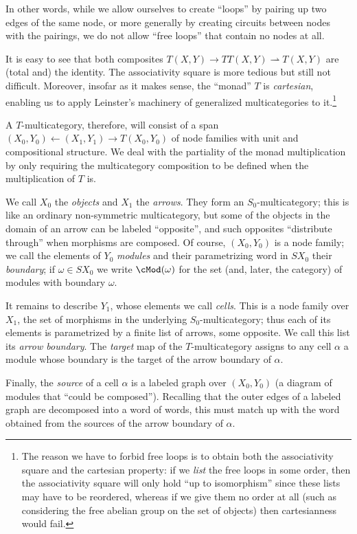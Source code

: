 \documentclass{amsart}
\begin{document}
In other words, while we allow ourselves to create ``loops'' by pairing up two edges of the same node, or more generally by creating circuits between nodes with the pairings, we do not allow ``free loops'' that contain no nodes at all.

It is easy to see that both composites $T(X,Y) \to TT(X,Y) \rightharpoonup T(X,Y)$ are (total and) the identity.
The associativity square is more tedious but still not difficult.
Moreover, insofar as it makes sense, the ``monad'' $T$ is \emph{cartesian}, enabling us to apply Leinster's machinery of generalized multicategories to it.\footnote{The reason we have to forbid free loops is to obtain both the associativity square and the cartesian property: if we \emph{list} the free loops in some order, then the associativity square will only hold ``up to isomorphism'' since these lists may have to be reordered, whereas if we give them no order at all (such as considering the free abelian group on the set of objects) then cartesianness would fail.}

A $T$-multicategory, therefore, will consist of a span $(X_0,Y_0) \leftarrow (X_1,Y_1) \to T(X_0,Y_0)$ of node families with unit and compositional structure.
We deal with the partiality of the monad multiplication by only requiring the multicategory composition to be defined when the multiplication of $T$ is.

We call $X_0$ the \emph{objects} and $X_1$ the \emph{arrows}.
They form an $S_0$-multicategory; this is like an ordinary non-symmetric multicategory, but some of the objects in the domain of an arrow can be labeled ``opposite'', and such opposites ``distribute through'' when morphisms are composed.
Of course, $(X_0,Y_0)$ is a node family; we call the elements of $Y_0$ \emph{modules} and their parametrizing word in $SX_0$ their \emph{boundary}; if $\omega\in SX_0$ we write $\cMod(\omega)$ for the set (and, later, the category) of modules with boundary $\omega$.

It remains to describe $Y_1$, whose elements we call \emph{cells}.
This is a node family over $X_1$, the set of morphisms in the underlying $S_0$-multicategory; thus each of its elements is parametrized by a finite list of arrows, some opposite.
We call this list its \emph{arrow boundary}.
The \emph{target} map of the $T$-multicategory assigns to any cell $\alpha$ a module whose boundary is the target of the arrow boundary of $\alpha$.

Finally, the \emph{source} of a cell $\alpha$ is a labeled graph over $(X_0,Y_0)$ (a diagram of modules that ``could be composed'').
Recalling that the outer edges of a labeled graph are decomposed into a word of words, this must match up with the word obtained from the sources of the arrow boundary of $\alpha$.
\end{document}
